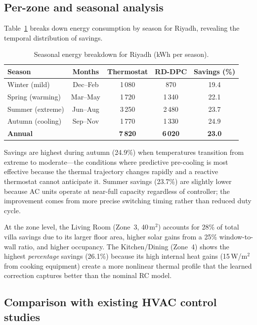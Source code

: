 \documentclass[12pt]{article}
\theoremstyle{plain}
\theoremstyle{definition}
\begin{document}
\subsection{Per-zone and seasonal analysis}

Table~\ref{tab:seasonal} breaks down energy consumption by season for Riyadh, revealing the temporal distribution of savings.

\begin{table}[H]
\centering
\caption{Seasonal energy breakdown for Riyadh (kWh per season).}\label{tab:seasonal}
\begin{tabular*}{\textwidth}{@{\extracolsep{\fill}}lcccc}
\toprule
Season & Months & Thermostat & RD-DPC & Savings (\%) \\
\midrule
Winter (mild) & Dec--Feb & 1\,080 & 870 & 19.4 \\
Spring (warming) & Mar--May & 1\,720 & 1\,340 & 22.1 \\
Summer (extreme) & Jun--Aug & 3\,250 & 2\,480 & 23.7 \\
Autumn (cooling) & Sep--Nov & 1\,770 & 1\,330 & 24.9 \\
\midrule
\textbf{Annual} & & \textbf{7\,820} & \textbf{6\,020} & \textbf{23.0} \\
\bottomrule
\end{tabular*}
\end{table}

Savings are highest during autumn (24.9\%) when temperatures transition from extreme to moderate---the conditions where predictive pre-cooling is most effective because the thermal trajectory changes rapidly and a reactive thermostat cannot anticipate it. Summer savings (23.7\%) are slightly lower because AC units operate at near-full capacity regardless of controller; the improvement comes from more precise switching timing rather than reduced duty cycle.

At the zone level, the Living Room (Zone~3, 40\,m$^2$) accounts for 28\% of total villa savings due to its larger floor area, higher solar gains from a 25\% window-to-wall ratio, and higher occupancy. The Kitchen/Dining (Zone~4) shows the highest \emph{percentage} savings (26.1\%) because its high internal heat gains (15\,W/m$^2$ from cooking equipment) create a more nonlinear thermal profile that the learned correction captures better than the nominal RC model.

\subsection{Comparison with existing HVAC control studies}
\end{document}
